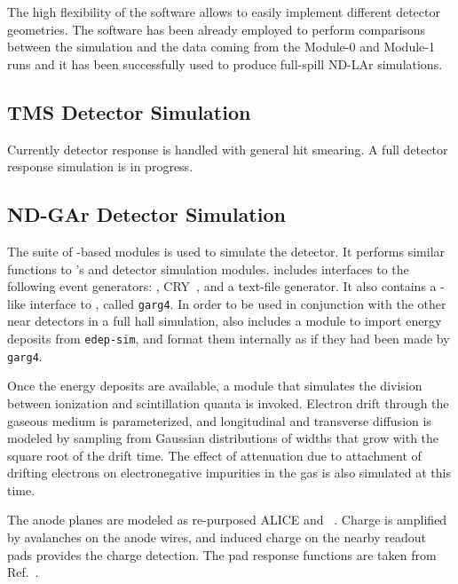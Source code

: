 \documentclass[../main-v1.tex]{subfiles}
\begin{document}
The high flexibility of the software allows to easily implement different detector geometries. The software has been already employed to perform comparisons between the simulation and the data coming from the Module-0 and Module-1 runs \cite{module0} and it has been successfully used to produce full-spill ND-LAr simulations.

\subsection{TMS Detector Simulation}
Currently detector response is handled with general hit smearing. A full detector response simulation is in progress. 

\subsection{ND-GAr Detector Simulation}
\label{sec:usecases_ndgardetsim}

The  suite of -based modules is used to simulate the  detector.  It performs similar functions to 's  and detector simulation modules.   includes interfaces to the following event generators:  , CRY~\cite{bib:cry2007,Cosmic-CRY}, and a text-file generator.  It also contains a -like interface to , called {\tt garg4}.  In order to be used in conjunction with the other near detectors in a full hall simulation,  also includes a module to import energy deposits from {\tt edep-sim}, and format them internally as if they had been made by {\tt garg4}.

Once the energy deposits are available, a module that simulates the division between ionization and scintillation quanta is invoked.  Electron drift through the gaseous medium is parameterized, and longitudinal and transverse diffusion is modeled by sampling from Gaussian distributions of widths that grow with the square root of the drift time.  The effect of attenuation due to attachment of drifting electrons on electronegative impurities in the gas is also simulated at this time. 

The anode planes are modeled as re-purposed ALICE %
 and  ~\cite{Dellacasa:2000bm}.  Charge is amplified by avalanches on the anode wires, and induced charge on the nearby readout pads provides the charge detection.  The pad response functions are taken from Ref.~\cite{Dellacasa:2000bm}.
\end{document}
